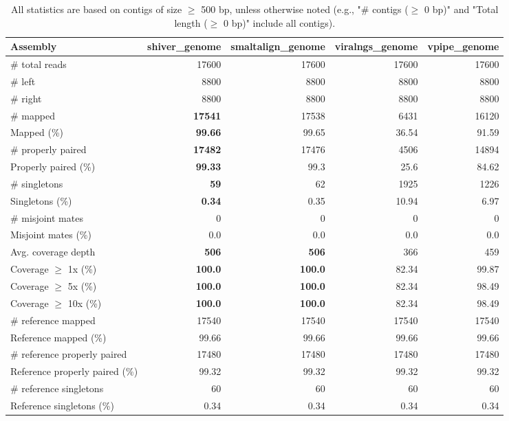 \documentclass[12pt,a4paper]{article}
\begin{document}
\begin{table}[ht]
\begin{center}
\caption{All statistics are based on contigs of size $\geq$ 500 bp, unless otherwise noted (e.g., "\# contigs ($\geq$ 0 bp)" and "Total length ($\geq$ 0 bp)" include all contigs).}
\begin{tabular}{|l*{4}{|r}|}
\hline
Assembly & shiver\_genome & smaltalign\_genome & viralngs\_genome & vpipe\_genome \\ \hline
\# total reads & 17600 & 17600 & 17600 & 17600 \\ \hline
\# left & 8800 & 8800 & 8800 & 8800 \\ \hline
\# right & 8800 & 8800 & 8800 & 8800 \\ \hline
\# mapped & {\bf 17541} & 17538 & 6431 & 16120 \\ \hline
Mapped (\%) & {\bf 99.66} & 99.65 & 36.54 & 91.59 \\ \hline
\# properly paired & {\bf 17482} & 17476 & 4506 & 14894 \\ \hline
Properly paired (\%) & {\bf 99.33} & 99.3 & 25.6 & 84.62 \\ \hline
\# singletons & {\bf 59} & 62 & 1925 & 1226 \\ \hline
Singletons (\%) & {\bf 0.34} & 0.35 & 10.94 & 6.97 \\ \hline
\# misjoint mates & 0 & 0 & 0 & 0 \\ \hline
Misjoint mates (\%) & 0.0 & 0.0 & 0.0 & 0.0 \\ \hline
Avg. coverage depth & {\bf 506} & {\bf 506} & 366 & 459 \\ \hline
Coverage $\geq$ 1x (\%) & {\bf 100.0} & {\bf 100.0} & 82.34 & 99.87 \\ \hline
Coverage $\geq$ 5x (\%) & {\bf 100.0} & {\bf 100.0} & 82.34 & 98.49 \\ \hline
Coverage $\geq$ 10x (\%) & {\bf 100.0} & {\bf 100.0} & 82.34 & 98.49 \\ \hline
\# reference mapped & 17540 & 17540 & 17540 & 17540 \\ \hline
Reference mapped (\%) & 99.66 & 99.66 & 99.66 & 99.66 \\ \hline
\# reference properly paired & 17480 & 17480 & 17480 & 17480 \\ \hline
Reference properly paired (\%) & 99.32 & 99.32 & 99.32 & 99.32 \\ \hline
\# reference singletons & 60 & 60 & 60 & 60 \\ \hline
Reference singletons (\%) & 0.34 & 0.34 & 0.34 & 0.34 \\ \hline

\end{tabular}
\end{center}
\end{table}
\end{document}
